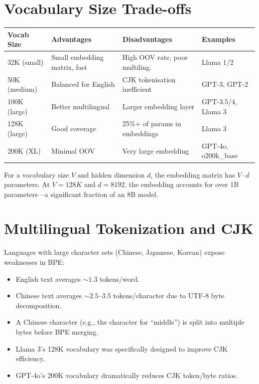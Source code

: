 \documentclass[11pt,a4paper]{book}
\theoremstyle{definition}
\begin{document}
\section{Vocabulary Size Trade-offs}

\begin{longtable}{p{3cm}p{4cm}p{4cm}p{4cm}}
	\toprule
	\textbf{Vocab Size} & \textbf{Advantages}          & \textbf{Disadvantages}         & \textbf{Examples}   \\
	\midrule
	32K (small)         & Small embedding matrix, fast & High OOV rate, poor multiling. & Llama 1/2           \\
	50K (medium)        & Balanced for English         & CJK tokenisation inefficient   & GPT-3, GPT-2        \\
	100K (large)        & Better multilingual          & Larger embedding layer         & GPT-3.5/4, Llama 3  \\
	128K (large)        & Good coverage                & 25\%+ of params in embeddings  & Llama 3             \\
	200K (XL)           & Minimal OOV                  & Very large embedding           & GPT-4o, o200k\_base \\
	\bottomrule
\end{longtable}

For a vocabulary size $V$ and hidden dimension $d$, the embedding matrix has $V \cdot d$ parameters. At $V = 128K$ and $d = 8192$, the embedding accounts for over 1B parameters---a significant fraction of an 8B model.

\section{Multilingual Tokenization and CJK}

Languages with large character sets (Chinese, Japanese, Korean) expose weaknesses in BPE:

\begin{itemize}
	\item English text averages $\sim 1.3$ tokens/word.
	\item Chinese text averages $\sim 2.5$--$3.5$ tokens/character due to UTF-8 byte decomposition.
	\item A Chinese character (e.g., the character for ``middle'') is split into multiple bytes before BPE merging.
	\item Llama 3's 128K vocabulary was specifically designed to improve CJK efficiency.
	\item GPT-4o's 200K vocabulary dramatically reduces CJK token/byte ratios.
\end{itemize}
\end{document}

